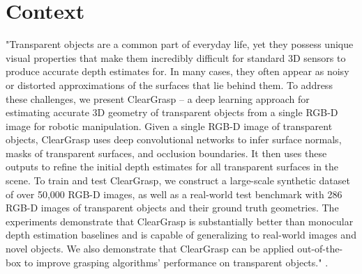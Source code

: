 
  
  


\chapter{Context}
\label{Context} 

"Transparent objects are a common part of everyday life, yet they possess unique visual properties that make them incredibly difficult for standard 3D sensors to produce accurate depth estimates for. In many cases, they often appear as noisy or distorted approximations of the surfaces that lie behind them. To address these challenges, we present ClearGrasp -- a deep learning approach for estimating accurate 3D geometry of transparent objects from a single RGB-D image for robotic manipulation. Given a single RGB-D image of transparent objects, ClearGrasp uses deep convolutional networks to infer surface normals, masks of transparent surfaces, and occlusion boundaries. It then uses these outputs to refine the initial depth estimates for all transparent surfaces in the scene. To train and test ClearGrasp, we construct a large-scale synthetic dataset of over 50,000 RGB-D images, as well as a real-world test benchmark with 286 RGB-D images of transparent objects and their ground truth geometries. The experiments demonstrate that ClearGrasp is substantially better than monocular depth estimation baselines and is capable of generalizing to real-world images and novel objects. We also demonstrate that ClearGrasp can be applied out-of-the-box to improve grasping algorithms' performance on transparent objects." \cite{sajjan2019cleargrasp}.

